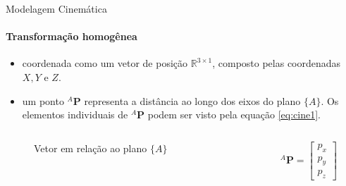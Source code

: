 \documentclass{beamer}
\begin{document}
\begin{frame}{Modelagem Cinemática}
    \framesubtitle{Transformação homogênea}
    \begin{itemize}
        \item coordenada como um vetor de posição $\mathbb{R}^{3 \times 1}$, composto pelas coordenadas $X,Y$ e $Z$.
        \item um ponto ${}^A\mathbf{P}$ representa a distância ao longo dos eixos do plano $\{A\}$. Os elementos individuais de ${}^A\mathbf{P}$ podem ser visto pela equação \eqref{eq:cine1}.
    \end{itemize}
    \begin{columns}[c]
        \begin{column}{0.6\textwidth}
            \begin{figure}
                \centering
                \caption{Vetor em relação ao plano $\{A\}$}
                \label{fig:cine1f}
            \end{figure}
        \end{column}
        \begin{column}{0.3\textwidth}
            \begin{equation}\label{eq:cine1}
                {}^A\mathbf{P} = \begin{bmatrix}
                    p_x \\ p_y \\ p_z
                \end{bmatrix}
            \end{equation}
        \end{column}
    \end{columns}
\end{frame}
\end{document}
